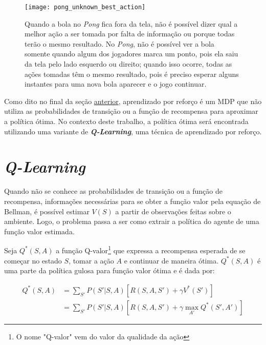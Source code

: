 \begin{figure}[h!]
  \centering
  \texttt{[image: pong\_unknown\_best\_action]}
  \caption{Quando a bola no \textit{Pong} fica fora da tela, não é possível dizer qual a melhor ação a ser tomada por falta de informação ou porque todas terão o mesmo resultado. No \textit{Pong}, não é possível ver a bola somente quando algum dos jogadores marca um ponto, pois ela saiu da tela pelo lado esquerdo ou direito; quando isso ocorre, todas as ações tomadas têm o mesmo resultado, pois é preciso esperar alguns instantes para uma nova bola aparecer e o jogo continuar.}
  \label{fig:unknown_best_action}
\end{figure}

Como dito no final da seção \hyperref[sec:mdp]{anterior}, aprendizado por reforço é um MDP que não utiliza as probabilidades de transição ou a função de recompensa para aproximar a política ótima.
No contexto deste trabalho, a política ótima será encontrada utilizando uma variante de \textit{\textbf{Q-Learning}}, uma técnica de aprendizado por reforço.


\section{\textit{Q-Learning}}
\label{sec:ql}

Quando não se conhece as probabilidades de transição ou a função de recompensa, informações necessárias para se obter a função valor pela equação de Bellman, é possível estimar $V(S)$ a partir de observações feitas sobre o ambiente.
Logo, o problema passa a ser como extrair a política do agente de uma função valor estimada.

Seja $Q^{*}(S,A)$ a função Q-valor\footnote{O nome "Q-valor"{} vem do valor da qualidade da ação} que expressa a recompensa esperada de se começar no estado $S$, tomar a ação $A$ e continuar de maneira ótima. $Q^{*}(S,A)$ é uma parte da política gulosa para função valor ótima e é dada por:

\begin{equation} \label{eq:qfunction}
\begin{align*}
Q^{*}(S,A) &= \sum_{S'}P(S'|S,A)[R(S,A,S') + \gamma V^{*}(S')] \\
        &= \sum_{S'}P(S'|S,A)[R(S,A,S') + \gamma \max_{A'}Q^{*}(S',A')]
\end{align*}
\end{equation}

